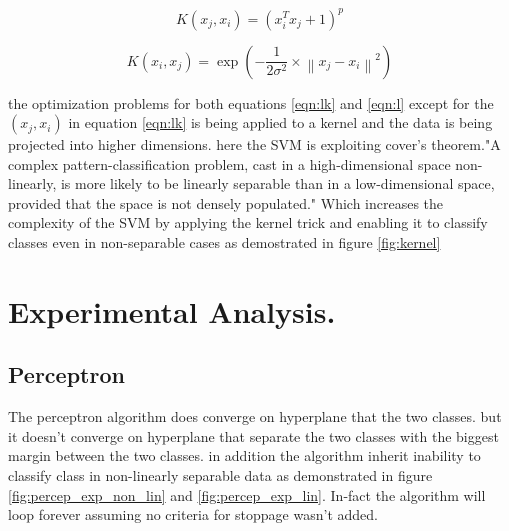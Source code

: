 \documentclass[10pt,twocolumn,letterpaper]{article}
\begin{document}
\begin{equation}
K\left( x_{j},x_{i}\right) =\left( x_{i}^{T}x_{j}+1\right) ^{p}
\end{equation}


\begin{equation}
K\left( x_{i},x_{j}\right) =\exp \left( -\dfrac{1}{2\sigma ^{2}}\times \left\| x_{j}-x_{i}\right\| ^{2}\right) 
\end{equation}

the optimization problems for both equations \ref{eqn:lk} and \ref{eqn:l} except for the $( x_{j},x_{i})$ in equation \ref{eqn:lk} is being applied to a kernel and the data is being projected into higher dimensions. here the SVM is exploiting cover's theorem."A complex pattern-classification problem, cast in a high-dimensional space non-linearly, is more likely to be linearly separable than in a low-dimensional space, provided that the space is not densely populated." \cite{Cover1965} Which increases the complexity of the SVM by applying the kernel trick and enabling it to classify classes even in non-separable cases as demostrated in figure \ref{fig:kernel}

\section{Experimental Analysis.}
\subsection{Perceptron}

The perceptron algorithm does converge on hyperplane that  the two classes. but it doesn't converge on hyperplane that separate the two classes with the biggest margin between the two classes. in addition the algorithm inherit inability to classify class in non-linearly separable data as demonstrated in figure \ref{fig:percep_exp_non_lin} and \ref{fig:percep_exp_lin}. In-fact the algorithm will loop forever assuming no criteria for stoppage wasn't added.

\end{document}
